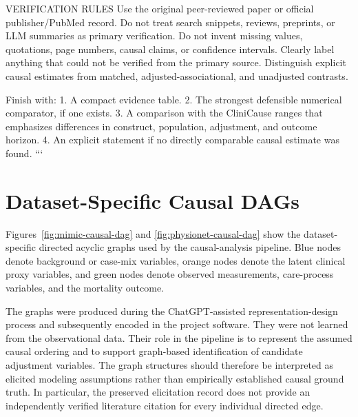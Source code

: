 \documentclass[letterpaper,10pt]{article}
\begin{document}
VERIFICATION RULES
Use the original peer-reviewed paper or official publisher/PubMed record.
Do not treat search snippets, reviews, preprints, or LLM summaries as primary
verification. Do not invent missing values, quotations, page numbers, causal
claims, or confidence intervals. Clearly label anything that could not be
verified from the primary source. Distinguish explicit causal estimates from
matched, adjusted-associational, and unadjusted contrasts.

Finish with:
1. A compact evidence table.
2. The strongest defensible numerical comparator, if one exists.
3. A comparison with the CliniCause ranges that emphasizes differences in
   construct, population, adjustment, and outcome horizon.
4. An explicit statement if no directly comparable causal estimate was found.
```

\clearpage
\section{Dataset-Specific Causal DAGs}
\label{sec:supp-dags}

Figures~\ref{fig:mimic-causal-dag} and
\ref{fig:physionet-causal-dag} show the dataset-specific directed acyclic
graphs used by the causal-analysis pipeline. Blue nodes denote background or
case-mix variables, orange nodes denote the latent clinical proxy variables,
and green nodes denote observed measurements, care-process variables, and the
mortality outcome.

The graphs were produced during the ChatGPT-assisted representation-design
process and subsequently encoded in the project software. They were not learned
from the observational data. Their role in the pipeline is to represent the
assumed causal ordering and to support graph-based identification of candidate
adjustment variables. The graph structures should therefore be interpreted as
elicited modeling assumptions rather than empirically established causal
ground truth. In particular, the preserved elicitation record does not provide
an independently verified literature citation for every individual directed
edge.
\end{document}
